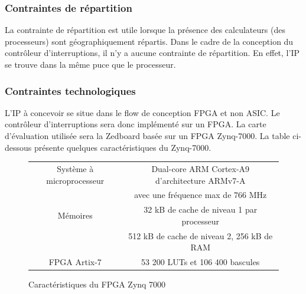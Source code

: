 \subsubsection{Contraintes de répartition}

La contrainte de répartition est utile lorsque la présence des calculateurs (des processeurs) sont géographiquement répartis.
Dans le cadre de la conception du contrôleur d'interruptions, il n'y a aucune contrainte de répartition.
En effet, l'IP se trouve dans la même puce que le processeur.

\subsubsection{Contraintes technologiques}

L'IP à concevoir se situe dans le flow de conception FPGA et non ASIC.
Le contrôleur d'interruptions sera donc implémenté sur un FPGA.
La carte d'évaluation utilisée sera la Zedboard basée sur un FPGA Zynq-7000. La table ci-dessous présente quelques caractéristiques du Zynq-7000.

\begin{figure}[H]
	\centering
	\begin{tabular}{|c|c|}
		\hline
		Système à microprocesseur & Dual-core ARM Cortex-A9 d'architecture ARMv7-A\\
		& avec une fréquence max de 766 MHz\\
		\hline
		Mémoires & 32 kB de cache de niveau 1 par processeur\\
		& 512 kB de cache de niveau 2, 256 kB de RAM\\
		\hline
		FPGA Artix-7 & 53 200 LUTs et 106 400 bascules\\
		\hline
	\end{tabular}
	\caption{Caractéristiques du FPGA Zynq 7000}
	\label{tab:zynq_7000}
\end{figure}